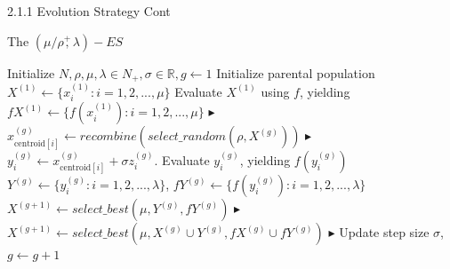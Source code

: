 \documentclass{beamer}
\begin{document}
\begin{frame}{2.1.1 Evolution Strategy Cont}
\begin{block}{The $(\mu/\rho\overset{+}{,}\lambda)-ES$}
 \footnotesize{
    \begin{algorithm}[H]
    \begin{algorithmic}[1]
        \STATE Initialize $N,\rho,\mu,\lambda \in N_+,\sigma \in \mathbb{R}, g \leftarrow 1$
        \STATE Initialize parental population $X^{(1)} \leftarrow \{x_i^{(1)}: i=1,2,...,\mu\}$
        \STATE Evaluate $X^{(1)}$ using $f$, yielding $fX^{(1)} \leftarrow \{ f(x_i^{(1)}): i=1,2,...,\mu \}$
        	        \hfill$\blacktriangleright$ %
        		\STATE $x_{\text{centroid}[i]}^{(g)} \leftarrow  recombine (select\_random (\rho,X^{(g)}))$  
        		    \hfill$\blacktriangleright$ %
        		\STATE $y_i^{(g)} \leftarrow x_{\text{centroid}[i]}^{(g)} + \sigma z_i^{(g)}$. Evaluate $y_i^{(g)}$, yielding $f(y_i^{(g)})$
        	\ENDFOR
        	\STATE $Y^{(g)} \leftarrow \{y_i^{(g)}: i=1,2,...,\lambda\}$,  $fY^{(g)} \leftarrow \{f(y_i^{(g)}): i=1,2,...,\lambda\}$
        		\STATE $X^{(g+1)} \leftarrow  select\_best
        		(\mu,Y^{(g)},fY^{(g)})$
        		    \hfill$\blacktriangleright$ %
        		\STATE $X^{(g+1)} \leftarrow  select\_best (\mu,X^{(g)} \cup Y^{(g)},fX^{(g)} \cup fY^{(g)})$
        		    \hfill$\blacktriangleright$ %
        	\ENDIF
        	\STATE Update step size $\sigma$, $g\leftarrow g+1$
        \ENDWHILE
    \end{algorithmic}
    \end{algorithm}
}
\end{block}
\end{frame}
\end{document}
